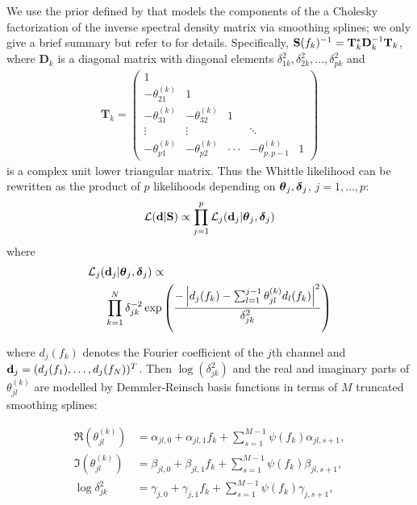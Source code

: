 \documentclass[%
 reprint,
 amsmath,amssymb,
 aps,
 nofootinbib,
]{revtex4-2}
\begin{document}
We use the prior defined by \citet{RosenOri2007Aeom,Hu2023} that models the components of the  a Cholesky factorization of the inverse spectral density matrix  via smoothing splines; we only give a brief summary but refer to \cite{Hu2023} for details.
Specifically, $\S(f_k)^{-1} = \mathbf{T}_k^* \mathbf{D}_k^{-1} \mathbf{T}_k$, where $\mathbf{D}_k$ is a diagonal matrix with diagonal elements $\delta_{1k}^2, \delta_{2k}^2, ..., \delta_{pk}^2$ and
\begin{align*}
\mathbf{T}_k = \begin{pmatrix}1\\-\theta_{21}^{(k)} & 1 \\ -\theta_{31}^{(k)} & -\theta_{32}^{(k)} & 1\\\vdots &\vdots & &\ddots \\
-\theta_{p1}^{(k)} &-\theta_{p2}^{(k)} & \cdot\cdot\cdot& -\theta_{p,p-1}^{(k)} &1
\end{pmatrix}
\end{align*}
is a complex unit lower triangular matrix. Thus the Whittle likelihood can be rewritten as the product of $p$ likelihoods depending on $\btheta_j,\bdelta_j$, $j=1,\ldots,p$:
\begin{align}
 \mathcal{L}(\d|\S)
 \propto \prod_{j=1}^{p} \mathcal{L}_j(\d_j|{\btheta_j,\bdelta_j})
 \label{eq:likelihood}
\end{align}
where
\begin{align}
\mathcal{L}_j(&\d_j|\btheta_j,\bdelta_j) \propto \nonumber \\
&  \prod_{k=1}^{N} \delta_{jk}^{-2} \exp \left(\frac{-\left|d_j(f_k)-\sum_{l=1}^{j-1}\theta_{jl}^{(k)}d_l(f_k) \right|^2}{\delta_{jk}^2} \right)
\label{eq:likelihoodj}
\end{align}

%
where $d_j(f_k)$ denotes the Fourier coefficient of the $j$th channel and $\d_j=(d_j(f_1),\ldots,d_j(f_N))^T$.
Then  $\log(\delta_{jk}^2)$ and the real and imaginary parts of $\theta_{jl}^{(k)}$ are modelled by Demmler-Reinsch basis functions in terms of $M$ truncated smoothing splines:

\begin{align}
\Re(\theta_{jl}^{(k)}) &= \alpha_{jl,0} + \alpha_{jl,1}f_k + \sum_{s=1}^{M-1}\psi(f_k)\alpha_{jl,s+1}, \\
\Im(\theta_{jl}^{(k)}) &= \beta_{jl,0} + \beta_{jl,1}f_k + \sum_{s=1}^{M-1}\psi(f_k)\beta_{jl,s+1}, \\
\log \delta_{jk}^2 &= \gamma_{j,0} + \gamma_{j,1}f_k + \sum_{s=1}^{M-1}\psi(f_k)\gamma_{j,s+1},  
\end{align}
\end{document}

